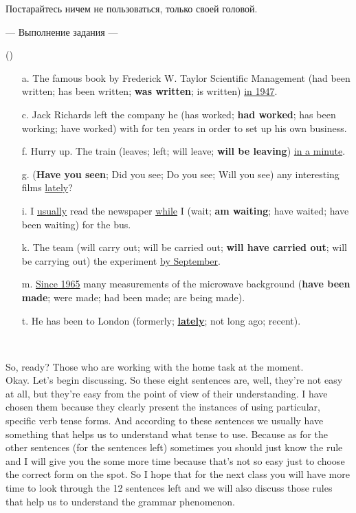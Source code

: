 \documentclass[main.tex]{subfiles}
\begin{document}
Постарайтесь ничем не пользоваться, только своей головой.

\newpage
{}

\hypertarget{ltask:2024-01-24}{--- Выполнение задания ---} (\hyperref[task:2024-01-24]{\color{blue}{перейти к тексту задания}})
\\


\begin{enumerate}[nosep,leftmargin=8mm,label=\alph*.]
	\itemsep\eitsp
	\item[a.] The famous book by Frederick W. Taylor Scientific Management (had been written; has been written; \textbf{was written}; is written) \uline{in 1947}.
	\item[c.] Jack Richards left the company he (has worked; \textbf{had worked}; has been working; have worked) with for ten years in order to set up his own business.
	\item[f.] Hurry up. The train (leaves; left; will leave; \textbf{will be leaving}) \uline{in a minute}.
	\item[g.] (\textbf{Have you seen}; Did you see; Do you see; Will you see) any interesting films \uline{lately}?
	\item[i.] I \uline{usually} read the newspaper \uline{while} I (wait; \textbf{am waiting}; have waited; have been waiting) for the bus.
	\item[k.] The team (will carry out; will be carried out; \textbf{will have carried out}; will be carrying out) the experiment \uline{by September}.
	\item[m.] \uline{Since 1965} many measurements of the microwave background (\textbf{have been made}; were made; had been made; are being made).
	\item[t.] He has been to London (formerly; \uline{\textbf{lately}}; not long ago; recent).
\end{enumerate}
\ 

So, ready? Those who are working with the home task at the moment.
\\

Okay.
Let's begin discussing.
So these eight sentences are, well, they're not easy at all, but they're easy from the point of view of their understanding.
I have chosen them because they clearly present the instances of using particular, specific verb tense forms.
And according to these sentences we usually have something that helps us to understand what tense to use.
Because as for the other sentences (for the sentences left) sometimes you should just know the rule and I will give you the some more time because that's not so easy just to choose the correct form on the spot.
So I hope that for the next class you will have more time to look through the 12 sentences left and we will also discuss those rules that help us to understand the grammar phenomenon.
\end{document}
